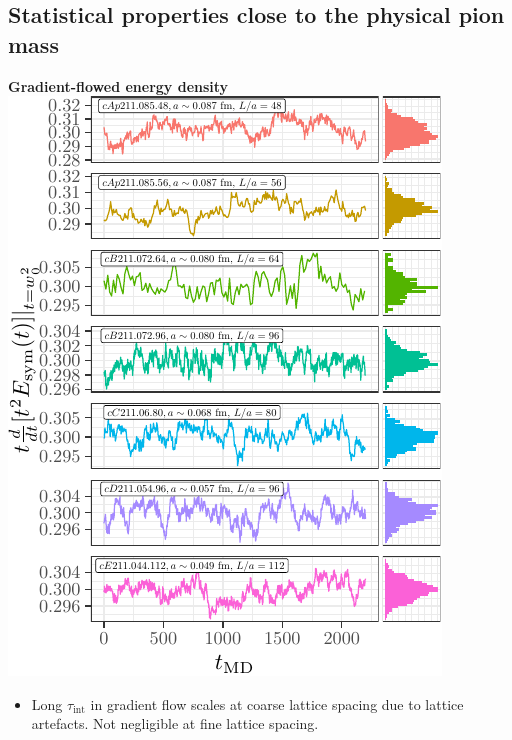 \documentclass[a0,portrait]{a0poster}
\begin{document}
\begin{multicols}{2}
    \section{Statistical properties close to the physical pion mass}
    \begin{minipage}{0.48\linewidth}
      \centering
      \textbf{\hspace{3cm}Gradient-flowed energy density}\\
      \includegraphics[width=\linewidth,page=1]{data/gf_observables/gf_observables_md_histories}
      \begin{itemize}
        \item Long $\tau_\mathrm{int}$ in gradient flow scales at coarse lattice spacing due to lattice artefacts. Not negligible at fine lattice spacing.
      \end{itemize}
    \end{minipage}
    \hfill
    \begin{minipage}{0.48\linewidth}

\end{minipage}
\end{multicols}
\end{document}
